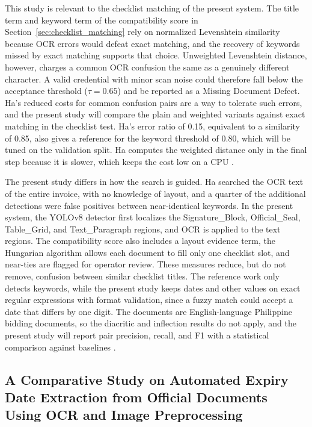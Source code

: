 This study is relevant to the checklist matching of the present system.
The title term and keyword term of the compatibility score in Section~\ref{sec:checklist_matching} rely on normalized Levenshtein similarity because OCR errors would defeat exact matching, and the recovery of keywords missed by exact matching supports that choice.
Unweighted Levenshtein distance, however, charges a common OCR confusion the same as a genuinely different character.
A valid credential with minor scan noise could therefore fall below the acceptance threshold ($\tau = 0.65$) and be reported as a Missing Document Defect.
Ha's reduced costs for common confusion pairs are a way to tolerate such errors, and the present study will compare the plain and weighted variants against exact matching in the checklist test.
Ha's error ratio of 0.15, equivalent to a similarity of 0.85, also gives a reference for the keyword threshold of 0.80, which will be tuned on the validation split.
Ha computes the weighted distance only in the final step because it is slower, which keeps the cost low on a CPU \cite{docxb1}.

The present study differs in how the search is guided.
Ha searched the OCR text of the entire invoice, with no knowledge of layout, and a quarter of the additional detections were false positives between near-identical keywords.
In the present system, the YOLOv8 detector first localizes the Signature\_Block, Official\_Seal, Table\_Grid, and Text\_Paragraph regions, and OCR is applied to the text regions.
The compatibility score also includes a layout evidence term, the Hungarian algorithm allows each document to fill only one checklist slot, and near-ties are flagged for operator review.
These measures reduce, but do not remove, confusion between similar checklist titles.
The reference work only detects keywords, while the present study keeps dates and other values on exact regular expressions with format validation, since a fuzzy match could accept a date that differs by one digit.
The documents are English-language Philippine bidding documents, so the diacritic and inflection results do not apply, and the present study will report pair precision, recall, and F1 with a statistical comparison against baselines \cite{docxa1}.

\subsection{A Comparative Study on Automated Expiry Date Extraction from Official Documents Using OCR and Image Preprocessing}
\label{sec:related_expiry_date}

